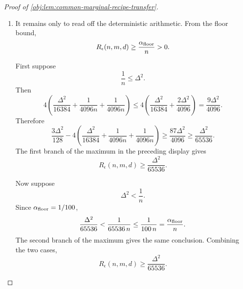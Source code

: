 \begin{proof}[Proof of \cref{obj:lem:common-marginal-recipe-transfer}]
\begin{enumerate}
\item It remains only to read off the deterministic arithmetic.  From the floor bound,
\[
R_\epsilon(n,m,d)\ge \frac{\alpha_{\rm floor}}{n}>0.
\]

First suppose
\[
\frac1n\le \Delta^2.
\]
Then
\[
4\left(\frac{\Delta^2}{16384}
+\frac1{4096n}
+\frac1{4096n}\right)
\le
4\left(\frac{\Delta^2}{16384}
+\frac{2\Delta^2}{4096}\right)
=
\frac{9\Delta^2}{4096}.
\]
Therefore
\[
\frac{3\Delta^2}{128}
-
4\left(\frac{\Delta^2}{16384}
+\frac1{4096n}
+\frac1{4096n}\right)
\ge
\frac{87\Delta^2}{4096}
\ge
\frac{\Delta^2}{65536}.
\]
The first branch of the maximum in the preceding display gives
\[
R_\epsilon(n,m,d)\ge \frac{\Delta^2}{65536}.
\]

Now suppose
\[
\Delta^2<\frac1n.
\]
Since \(\alpha_{\rm floor}=1/100\),
\[
\frac{\Delta^2}{65536}
<
\frac1{65536\,n}
\le
\frac1{100\,n}
=
\frac{\alpha_{\rm floor}}{n}.
\]
The second branch of the maximum gives the same conclusion.  Combining the two cases,
\[
R_\epsilon(n,m,d)\ge \frac{\Delta^2}{65536}.
\] %
\end{enumerate}
\end{proof}
